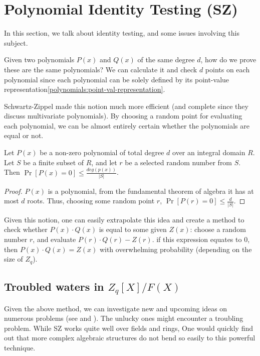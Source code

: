 \section{Polynomial Identity Testing (SZ)}\label{schawtz-zippel}
In this section, we talk about identity testing, 
and some issues involving this subject.

Given two polynomials $P(x)$ and $Q(x)$ of the same degree $d$, 
how do we prove these are the same polynomials?
We can calculate it and check $d$ points on each polynomial 
since each polynomial can be solely defined by its point-value representation\ref{polynomials:point-val-representation}.


Schwartz-Zippel \cite{SZ} made this notion much more efficient 
(and complete since they discuss multivariate polynomials).
By choosing a random point for evaluating each polynomial, we can 
be almost entirely certain 
whether the polynomials are equal or not.

\begin{theorem}
 Let $P(x)$ be a non-zero polynomial of total degree $d$ over 
 an integral domain $R$. Let $S$ be a finite subset of $R$, and let $r$
 be a selected random number from $S$. Then
  $\Pr [P(x)=0]\le \frac{deg(p(x))}{|S|}$.
\end{theorem}
\begin{proof}
  $P(x)$ is a polynomial, from the fundamental theorem of algebra\cite{Aigner2010} it has 
 at most $d$ roots. Thus, choosing some random point $r$,
  $\Pr [P(r)=0]\le \frac{d}{|S|}$. 
\end{proof}


Given this notion, one can easily extrapolate this idea and create a method 
to check whether $P(x)\cdot Q(x)$ is equal to some given $Z(x)$: 
choose a random number $r$, and evaluate $P(r)\cdot Q(r) - Z(r)$.
if this expression equates to $0$, then $P(x)\cdot Q(x)=Z(x)$ with overwhelming 
probability (depending on the size of $Z_q$).

\subsection{Troubled waters in $Z_q[X]/F(X)$}
Given the above method, we can investigate new and upcoming ideas on numerous
problems (see  \cite{sz-usage2} and ).
The unlucky ones might encounter a troubling problem.
While SZ works quite well over fields and rings,
One would quickly find out that more complex algebraic structures do not 
bend so easily to this powerful technique.

